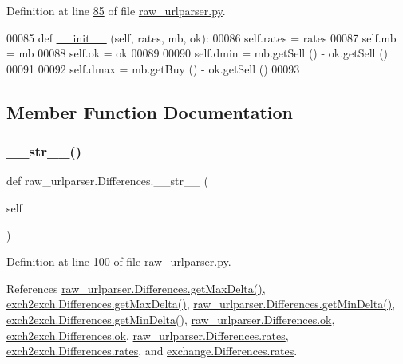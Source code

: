 Definition at line \hyperlink{raw__urlparser_8py_source_l00085}{85} of file \hyperlink{raw__urlparser_8py_source}{raw\+\_\+urlparser.\+py}.


\begin{DoxyCode}
00085     \textcolor{keyword}{def }\hyperlink{namespacestart__time_a9c9bd378729a13c96a22c8b079ea172c}{\_\_init\_\_} (self, rates, mb, ok):
00086         self.rates = rates
00087         self.mb = mb
00088         self.ok = ok
00089         
00090         self.dmin = mb.getSell () - ok.getSell ()
00091         
00092         self.dmax = mb.getBuy () - ok.getSell ()
00093         
\end{DoxyCode}


\subsection{Member Function Documentation}
\mbox{\label{classraw__urlparser_1_1_differences_ae30a248dbbe9fde42b0bcbd81160f070}} 
\subsubsection{\texorpdfstring{\+\_\+\+\_\+str\+\_\+\+\_\+()}{\_\_str\_\_()}}
{\footnotesize\ttfamily def raw\+\_\+urlparser.\+Differences.\+\_\+\+\_\+str\+\_\+\+\_\+ (\begin{DoxyParamCaption}\item[{}]{self }\end{DoxyParamCaption})}



Definition at line \hyperlink{raw__urlparser_8py_source_l00100}{100} of file \hyperlink{raw__urlparser_8py_source}{raw\+\_\+urlparser.\+py}.



References \hyperlink{raw__urlparser_8py_source_l00097}{raw\+\_\+urlparser.\+Differences.\+get\+Max\+Delta()}, \hyperlink{exch2exch_8py_source_l00130}{exch2exch.\+Differences.\+get\+Max\+Delta()}, \hyperlink{raw__urlparser_8py_source_l00094}{raw\+\_\+urlparser.\+Differences.\+get\+Min\+Delta()}, \hyperlink{exch2exch_8py_source_l00127}{exch2exch.\+Differences.\+get\+Min\+Delta()}, \hyperlink{raw__urlparser_8py_source_l00088}{raw\+\_\+urlparser.\+Differences.\+ok}, \hyperlink{exch2exch_8py_source_l00109}{exch2exch.\+Differences.\+ok}, \hyperlink{raw__urlparser_8py_source_l00086}{raw\+\_\+urlparser.\+Differences.\+rates}, \hyperlink{exch2exch_8py_source_l00107}{exch2exch.\+Differences.\+rates}, and \hyperlink{exchange_8py_source_l00264}{exchange.\+Differences.\+rates}.


